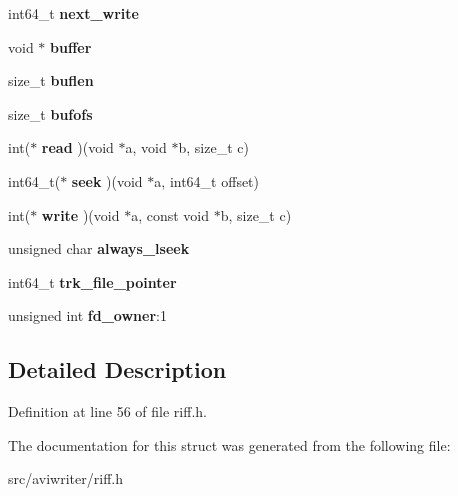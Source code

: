\begin{DoxyCompactItemize}
\item 
\hypertarget{structriff__stack_aeb351e2d1abec8d76487a7b04178c481}{int64\-\_\-t {\bfseries next\-\_\-write}}\label{structriff__stack_aeb351e2d1abec8d76487a7b04178c481}

\item 
\hypertarget{structriff__stack_a3d76dbd435b2472ab2c427dff25657d5}{void $\ast$ {\bfseries buffer}}\label{structriff__stack_a3d76dbd435b2472ab2c427dff25657d5}

\item 
\hypertarget{structriff__stack_a5b545033ec9d27482e37d5f81aca9669}{size\-\_\-t {\bfseries buflen}}\label{structriff__stack_a5b545033ec9d27482e37d5f81aca9669}

\item 
\hypertarget{structriff__stack_aa9ed713c7d4248f6117652e2b5d586b4}{size\-\_\-t {\bfseries bufofs}}\label{structriff__stack_aa9ed713c7d4248f6117652e2b5d586b4}

\item 
\hypertarget{structriff__stack_ab417c7c63df02daf38b0a34ae975bd91}{int($\ast$ {\bfseries read} )(void $\ast$a, void $\ast$b, size\-\_\-t c)}\label{structriff__stack_ab417c7c63df02daf38b0a34ae975bd91}

\item 
\hypertarget{structriff__stack_ada0ab6f698c21aa7857496550ea3301a}{int64\-\_\-t($\ast$ {\bfseries seek} )(void $\ast$a, int64\-\_\-t offset)}\label{structriff__stack_ada0ab6f698c21aa7857496550ea3301a}

\item 
\hypertarget{structriff__stack_aecb3e7a418616fe49e0548e739ef3df2}{int($\ast$ {\bfseries write} )(void $\ast$a, const void $\ast$b, size\-\_\-t c)}\label{structriff__stack_aecb3e7a418616fe49e0548e739ef3df2}

\item 
\hypertarget{structriff__stack_a1ba565b046269521df39f654ccc5f9e1}{unsigned char {\bfseries always\-\_\-lseek}}\label{structriff__stack_a1ba565b046269521df39f654ccc5f9e1}

\item 
\hypertarget{structriff__stack_a26bcc6f531b66d77b9372426d22ec115}{int64\-\_\-t {\bfseries trk\-\_\-file\-\_\-pointer}}\label{structriff__stack_a26bcc6f531b66d77b9372426d22ec115}

\item 
\hypertarget{structriff__stack_a463025a03886a7f8b844c60025f33ec4}{unsigned int {\bfseries fd\-\_\-owner}\-:1}\label{structriff__stack_a463025a03886a7f8b844c60025f33ec4}

\end{DoxyCompactItemize}


\subsection{Detailed Description}


Definition at line 56 of file riff.\-h.



The documentation for this struct was generated from the following file\-:\begin{DoxyCompactItemize}
\item 
src/aviwriter/riff.\-h\end{DoxyCompactItemize}
